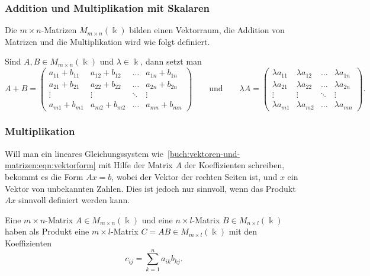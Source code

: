 \subsubsection{Addition und Multiplikation mit Skalaren}
Die $m\times n$-Matrizen $M_{m\times n}(\Bbbk)$ bilden einen Vektorraum,
die Addition von Matrizen und die Multiplikation wird wie folgt definiert.

\begin{definition}
Sind $A,B\in M_{m\times n}(\Bbbk)$ und $\lambda\in\Bbbk$, dann setzt man
\[
A+B
=
\begin{pmatrix}
a_{11}+b_{11}&a_{12}+b_{12}&\dots &a_{1n}+b_{1n}\\
a_{21}+b_{21}&a_{22}+b_{22}&\dots &a_{2n}+b_{2n}\\
\vdots       &\vdots       &\ddots&\vdots       \\
a_{m1}+b_{m1}&a_{m2}+b_{m2}&\dots &a_{mn}+b_{mn}
\end{pmatrix}
\qquad\text{und}\qquad
\lambda A
=
\begin{pmatrix}
\lambda a_{11}&\lambda a_{12}&\dots &\lambda a_{1n}\\
\lambda a_{21}&\lambda a_{22}&\dots &\lambda a_{2n}\\
\vdots        &\vdots        &\ddots&\vdots        \\
\lambda a_{m1}&\lambda a_{m2}&\dots &\lambda a_{mn}
\end{pmatrix}.
\]
\end{definition}

\subsubsection{Multiplikation}
Will man ein lineares Gleichungssystem
wie~\eqref{buch:vektoren-und-matrizen:eqn:vektorform}
mit Hilfe der Matrix $A$ der
Koeffizienten schreiben, bekommt es die Form $Ax=b$, wobei der Vektor
der rechten Seiten ist, und $x$ ein Vektor von unbekannten Zahlen.
Dies ist jedoch nur sinnvoll, wenn das Produkt $Ax$ sinnvoll definiert
werden kann.

\begin{definition}
\label{buch:vektoren-und-matrizen:def:matrixmultiplikation}
Eine $m\times n$-Matrix $A\in M_{m\times n}(\Bbbk)$ und eine
$n\times l$-Matrix $B\in M_{n\times l}(\Bbbk)$ haben als Produkt
eine $m\times l$-Matrix $C=AB\in M_{m\times l}(\Bbbk)$ mit den
Koeffizienten
\begin{equation}
c_{i\!j} = \sum_{k=1}^n a_{ik} b_{k\!j}.
\label{buch:vektoren-und-matrizen:eqn:matrixmultiplikation}
\end{equation}
\end{definition}

